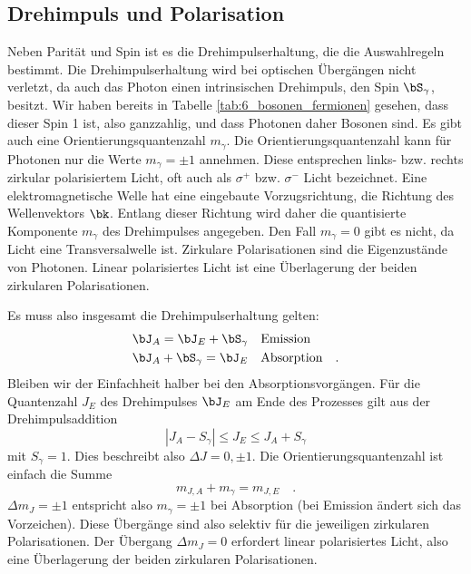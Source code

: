 \subsection{Drehimpuls und Polarisation}

Neben Parität und Spin ist es die Drehimpulserhaltung, die die Auswahlregeln bestimmt.
Die Drehimpulserhaltung wird bei optischen Übergängen nicht verletzt, da auch das Photon einen intrinsischen Drehimpuls, den Spin $\bS_\gamma$, besitzt. Wir haben bereits in Tabelle \ref{tab:6_bosonen_fermionen} gesehen, dass dieser Spin 1 ist, also ganzzahlig, und dass Photonen daher Bosonen sind. Es gibt auch eine Orientierungsquantenzahl $m_\gamma$. Die Orientierungsquantenzahl kann für Photonen nur die Werte $m_\gamma = \pm 1$ annehmen. Diese entsprechen links- bzw. rechts zirkular polarisiertem Licht, oft auch als $\sigma^+$ bzw. $\sigma^-$ Licht bezeichnet. Eine elektromagnetische Welle hat eine eingebaute Vorzugsrichtung, die Richtung des Wellenvektors $\bk$. Entlang dieser Richtung wird daher die quantisierte Komponente $m_\gamma$ des Drehimpulses angegeben. Den Fall $m_\gamma = 0$ gibt es nicht, da Licht eine Transversalwelle ist. Zirkulare Polarisationen sind die Eigenzustände von Photonen. Linear polarisiertes Licht ist eine Überlagerung der beiden zirkularen Polarisationen.

Es muss also insgesamt die Drehimpulserhaltung gelten:
\begin{align}
    \bJ_A = \bJ_E + \bS_\gamma  & \quad \text{Emission} \\
    \bJ_A + \bS_\gamma = \bJ_E & \quad \text{Absorption} \quad .
\end{align}
Bleiben wir der Einfachheit halber bei den Absorptionsvorgängen. Für die Quantenzahl $J_E$ des Drehimpulses $\bJ_E$ am Ende des Prozesses gilt aus der Drehimpulsaddition
\begin{equation}
    | J_A - S_\gamma | \le J_E \le J_A + S_\gamma
\end{equation}
mit $S_\gamma = 1$. Dies beschreibt also $\Delta J = 0, \pm 1$. Die Orientierungsquantenzahl ist einfach die Summe
\begin{equation}
    m_{J,A} + m_\gamma = m_{J,E} \quad .
\end{equation} 
$\Delta m_J = \pm 1$ entspricht also $ m_\gamma = \pm 1$ bei Absorption (bei Emission ändert sich das Vorzeichen). Diese Übergänge sind also selektiv für die jeweiligen zirkularen Polarisationen. Der Übergang $\Delta m_J = 0$ erfordert linear polarisiertes Licht, also eine Überlagerung der beiden zirkularen Polarisationen.


